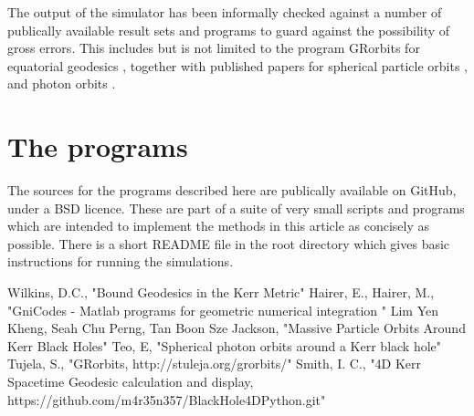 \documentclass[11pt]{article}
\begin{document}
The output of the simulator has been informally checked against a number of publically available result sets and programs to guard against the possibility of gross errors.  This includes  but is not limited to the program GRorbits for equatorial geodesics \cite{grorbits}, together with published papers for spherical particle orbits \cite{teo}, and photon orbits \cite{kheng}.

\section{The programs}

The sources for the programs \cite{m4r35n357} described here are publically available on GitHub, under a BSD licence.  These are part of a suite of very small scripts and programs which are intended to implement the methods in this article as concisely as possible.  There is a short README file in the root directory which gives basic instructions for running the simulations.

\begin{thebibliography}{1}
 Wilkins, D.C., "Bound Geodesics in the Kerr Metric"
  Hairer, E., Hairer, M., "GniCodes - Matlab programs for geometric numerical integration "
 Lim Yen Kheng, Seah Chu Perng, Tan Boon Sze Jackson, "Massive Particle Orbits Around Kerr Black Holes"
 Teo, E, "Spherical photon orbits around a Kerr black hole"
 Tujela, S., "GRorbits, http://stuleja.org/grorbits/"
 Smith, I. C., "4D Kerr Spacetime Geodesic calculation and display, https://github.com/m4r35n357/BlackHole4DPython.git"
\end{thebibliography}
\end{document}
